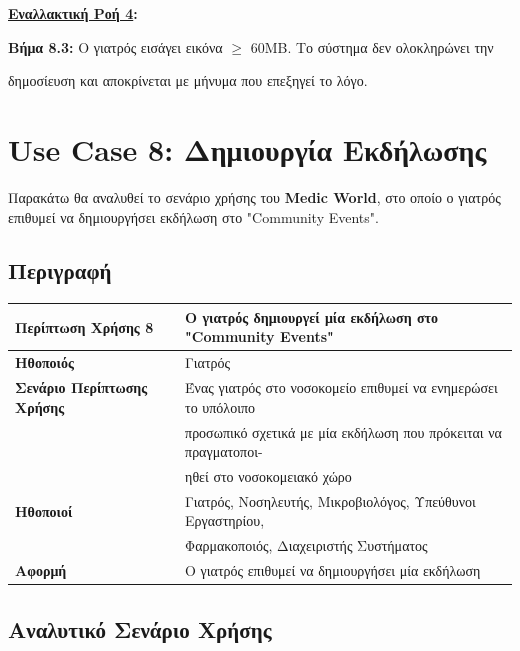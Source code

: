 \documentclass{article}
\newcommand\T{\rule{0pt}{2.6ex}}       %
\newcommand\B{\rule[-1.2ex]{0pt}{0pt}}
\begin{document}
\textbf{\underline{Εναλλακτική Ροή 4}:} \vspace{0.2cm}
\par \textbf{Βήμα 8.3:} Ο γιατρός εισάγει εικόνα $\ge$ 60MB. Το σύστημα δεν ολοκληρώνει την \par δημοσίευση και αποκρίνεται με μήνυμα που επεξηγεί το λόγο.

\newpage

\section{Use Case 8: Δημιουργία Εκδήλωσης}

Παρακάτω θα αναλυθεί το σενάριο χρήσης του \textbf{Medic World}, στο οποίο ο γιατρός επιθυμεί να δημιουργήσει εκδήλωση στο "Community Events".

\subsection{Περιγραφή}

\begin{center}
     \begin{tabular}{|l|l|}
     \hline
      \textbf{Περίπτωση Χρήσης 8} & Ο γιατρός δημιουργεί μία εκδήλωση στο "Community Events" \T\B \\ 
      \hline
      \textbf{Ηθοποιός} & Γιατρός \T\B \\
      \hline
      \textbf{Σενάριο Περίπτωσης Χρήσης} & Ένας γιατρός στο νοσοκομείο επιθυμεί να ενημερώσει το υπόλοιπο\T\\& προσωπικό σχετικά με μία εκδήλωση  που πρόκειται να πραγματοποι- \\& ηθεί στο νοσοκομειακό χώρο \B \\
      \hline
      \textbf{Ηθοποιοί} & Γιατρός, Νοσηλευτής, Μικροβιολόγος, Υπεύθυνοι Εργαστηρίου, \T \\& Φαρμακοποιός, Διαχειριστής Συστήματος \B \\
      \hline
      \textbf{Αφορμή} &  Ο γιατρός επιθυμεί να δημιουργήσει μία εκδήλωση\T\B \\
      \hline
     \end{tabular}
 \end{center}
 
 \subsection{Αναλυτικό Σενάριο Χρήσης}
\end{document}
